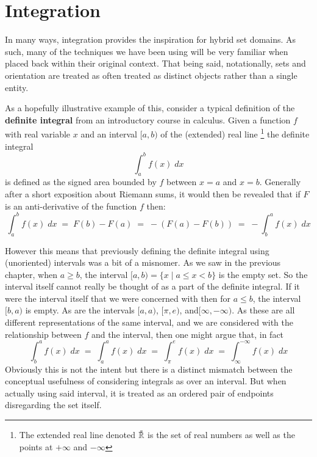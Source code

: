 \chapter{Integration}
\label{chp:Integration}


%
%

In many ways, integration provides the inspiration for hybrid set domains.
As such, many of the techniques we have been using will be very familiar when placed back within their original context.
That being said, notationally, sets and orientation are treated as often treated as distinct objects rather than a single entity.


As a hopefully illustrative example of this, consider a typical definition of the \textbf{definite integral} from an introductory
course in calculus.
Given a function $f$ with real variable $x$ and an interval $[a,b)$ of the (extended) real line
\footnote{ The extended real line denoted $\bar{\mathbb{R}}$ is the set of real numbers as well as the points at 
$+\infty$ and $-\infty$} the definite integral
\begin{equation*}
	\int_a^b f(x) \; dx
\end{equation*}
is defined as the signed area bounded by $f$ between $x=a$ and $x=b$.
Generally after a short exposition about Riemann sums, it would then be revealed that if $F$ is an anti-derivative of the
 function $f$ then:
\begin{equation*}
	\int_a^b f(x) \; dx \;=\; F(b)-F(a) \;=\; - (F(a)-F(b)) \;=\; - \int_b^a f(x) \; dx
\end{equation*}




However this means that previously defining the definite integral using (unoriented) intervals was a bit of a misnomer.
As we saw in the previous chapter, when $a \geq b$, the interval $[a,b) = \{ x \;|\; a \leq x < b \}$ is the empty set.
So the interval itself cannot really be thought of as a part of the definite integral.
If it were the interval itself that we were concerned with then for $a \leq b$, the interval $[b,a)$ is empty.
As are the intervals $[a,a)$, $[\pi, e)$, and$[\infty, -\infty)$.
As these are all different representations of the same interval, and we are considered with the relationship between $f$ and
the interval, then one might argue that, in fact
\begin{equation*}
	\int_b^a f(x) \; dx \;=\; \int_a^a f(x) \; dx \;=\; \int_\pi^e f(x)\;dx \;=\; \int_\infty^{-\infty} f(x) \; dx
\end{equation*}
Obviously this is not the intent but there is a distinct mismatch between the conceptual usefulness of considering
integrals as over an interval.
But when actually using said interval, it is treated as an ordered pair of endpoints disregarding the set itself.


